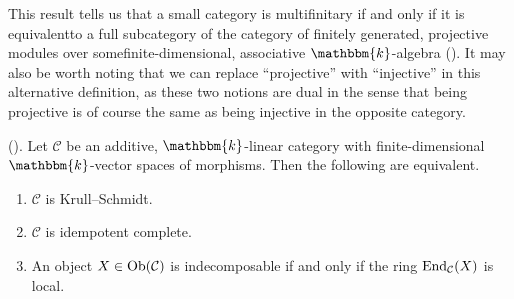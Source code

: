 \noindent\begin{remark}\label{FreydMitchellEquivalence} This result tells us that a small category is multifinitary if and only if it is equivalent\linebreak to a full subcategory of the category of finitely generated, projective modules over some\linebreak finite-dimensional, associative $\mathbbm{k}$-algebra (\cite{MMMTZ23}). It may also be worth noting that we can replace ``projective'' with ``injective'' in this alternative definition, as these two notions are dual in the sense that being projective is of course the same as being injective in the opposite category.\\
\end{remark}


\noindent\begin{theorem}\label{KrullSchmidt}\textnormal{(\cite[Theorem 6.1]{Sha23}).} Let $\mathcal{C}$ be an additive, $\mathbbm{k}$-linear category with finite-\linebreak dimensional $\mathbbm{k}$-vector spaces of morphisms. Then the following are equivalent.
\begin{enumerate}[label=\textnormal{(\roman*).}, leftmargin=4\parindent]
\item $\mathcal{C}$ is Krull--Schmidt.
\item $\mathcal{C}$ is idempotent complete.
\item An object $X \in \textnormal{Ob}(\mathcal{C})$ is indecomposable if and only if the ring $\textnormal{End}_\mathcal{C}(X)$ is local.\\
\end{enumerate}
\end{theorem}

